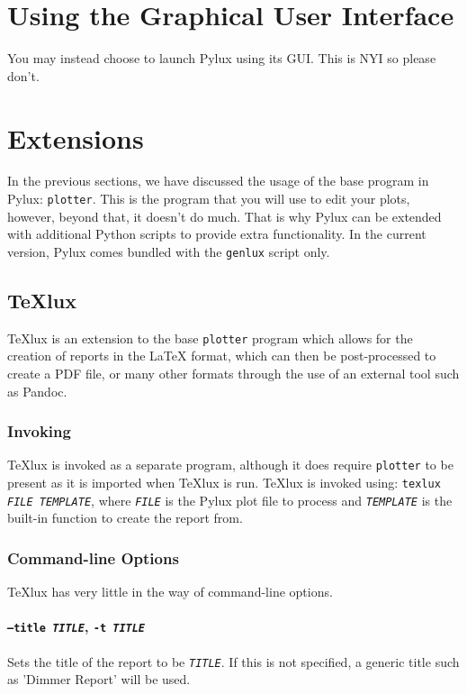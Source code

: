 \documentclass[a4paper]{article}
\begin{document}
\section{Using the Graphical User Interface}
You may instead choose to launch Pylux using its GUI. This is NYI so please 
don't.

\section{Extensions}
In the previous sections, we have discussed the usage of the base program in 
Pylux: \texttt{plotter}. This is the program that you will use to edit your
plots, however, beyond that, it doesn't do much. That is why Pylux can be 
extended with additional Python scripts to provide extra functionality. In 
the current version, Pylux comes bundled with the \texttt{genlux} script only.

\subsection{TeXlux}
TeXlux is an extension to the base \texttt{plotter} program which allows for 
the creation of reports in the \LaTeX{} format, which can then be 
post-processed to create a PDF file, or many other formats through the use of 
an external tool such as Pandoc.

\subsubsection{Invoking}
TeXlux is invoked as a separate program, although it does require 
\texttt{plotter} to be present as it is imported when TeXlux is run. TeXlux is 
invoked using: \texttt{texlux \textit{FILE} \textit{TEMPLATE}}, where 
\texttt{\textit{FILE}} is the Pylux plot file to process and 
\texttt{\textit{TEMPLATE}} is the built-in function to create the report from.

\subsubsection{Command-line Options}
TeXlux has very little in the way of command-line options.

\paragraph{\texttt{--title \textit{TITLE}}, \texttt{-t \textit{TITLE}}}
Sets the title of the report to be \texttt{\textit{TITLE}}. If this is not 
specified, a generic title such as 'Dimmer Report' will be used.
\end{document}
